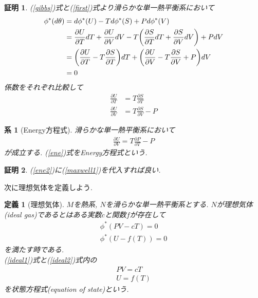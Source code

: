 \documentclass[a4paper,12pt]{ltjsarticle}
\theoremstyle{break}
\newtheorem{defn}[thm]{定義}
\newtheorem{lem}[thm]{補題}
\newtheorem{cor}[thm]{系}
\newtheorem*{prf}{証明}
\newcommand{\ddel}[2]{\frac{\partial{#1}}{\partial{#2}}}
\numberwithin{equation}{section}
\begin{document}
\begin{prf}
  (\ref{gibbs})式と(\ref{first})式より滑らかな単一熱平衡系において
  \begin{align*}
    \phi^*(d\theta) 
    &= d\phi^*(U) - Td\phi^*(S) + Pd\phi^*(V) \\
    &= \ddel{U}{T}dT + \ddel{U}{V}dV -T \qty(\ddel{S}{T}dT + \ddel{S}{V}dV) + PdV \\
    &= \qty(\ddel{U}{T} - T\ddel{S}{T})dT + \qty(\ddel{U}{V} - T\ddel{S}{V} + P)dV \\
    &= 0
  \end{align*}
  係数をそれぞれ比較して
  \begin{align*}
    \ddel{U}{T} &= T \ddel{S}{T} \\
    \ddel{U}{V} &= T\ddel{S}{V} - P 
  \end{align*}
\end{prf}

\begin{cor}[Energy方程式]
  滑らかな単一熱平衡系において
  \begin{align}
    \label{ene}
    \ddel{U}{V} = T\ddel{P}{T} - P
  \end{align}
  が成立する. 
  (\ref{ene})式をEnergy方程式という. 
\end{cor}  

\begin{prf}
  (\ref{ene2})に(\ref{maxwell1})を代入すれば良い. 
\end{prf}

次に理想気体を定義しよう. 

\begin{defn}[理想気体]
  $M$を熱系, $N$を滑らかな単一熱平衡系とする. 
  $N$が理想気体(ideal gas)であるとはある実数$c$と関数$f$が存在して
  \begin{align}
    \label{ideal1}
    \phi^*(PV-cT)
    = 0 \\
    \label{ideal2}
    \phi^*(U-f(T))
    = 0
  \end{align}
  を満たす時である. \\
  (\ref{ideal1})式と(\ref{ideal2})式内の
  \begin{align*}
    PV 
    = cT \\
    U
    = f(T)
  \end{align*}
  を状態方程式(equation of state)という. 
\end{defn}

\end{document}
